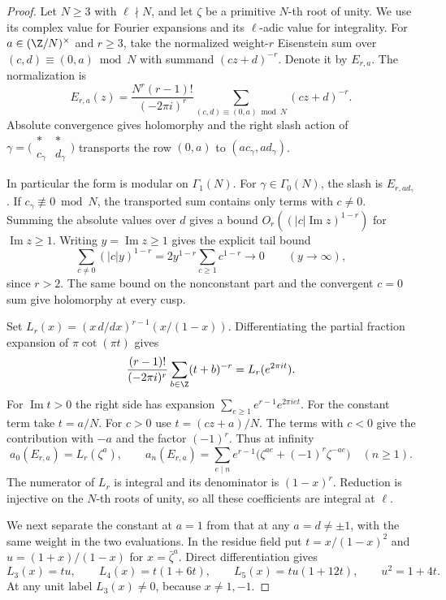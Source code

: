 \begin{proof}
Let \(N\geq3\) with \(\ell\nmid N\), and let
\(\zeta\) be a primitive \(N\)-th root of unity. We use its complex
value for Fourier expansions and its \(\ell\)-adic value for
integrality. For \(a\in(\Z/N)^\times\) and \(r\geq3\), take the
normalized weight-\(r\) Eisenstein sum over \((c,d)\equiv(0,a)\bmod N\)
with summand \((cz+d)^{-r}\). Denote it by \(E_{r,a}\). The normalization is
\[
 E_{r,a}(z)=\frac{N^r(r-1)!}{(-2\pi i)^r}
          \sum_{(c,d)\equiv(0,a)\bmod N}(cz+d)^{-r}.
\]
Absolute convergence gives holomorphy and the right slash action of
\(\gamma=\bigl(\begin{smallmatrix}*&*\\c_\gamma&d_\gamma\end{smallmatrix}\bigr)\)
transports the row \((0,a)\) to \((ac_\gamma,ad_\gamma)\).

In particular the form is modular on \(\Gamma_1(N)\). For
\(\gamma\in\Gamma_0(N)\), the slash is \(E_{r,ad_\gamma}\).
If \(c_\gamma\not\equiv0\bmod N\), the transported sum contains
only terms with \(c\ne0\). Summing the absolute values over \(d\)
gives a bound \(O_r((|c|\operatorname{Im} z)^{1-r})\) for
\(\operatorname{Im} z\geq1\). Writing \(y=\operatorname{Im}z\ge1\) gives the explicit tail bound
\[
 \sum_{c\ne0}(|c|y)^{1-r}
 =2y^{1-r}\sum_{c\ge1}c^{1-r}\longrightarrow0
 \qquad(y\to\infty),
\]
since \(r>2\). The same bound on the
nonconstant part and the convergent \(c=0\) sum give holomorphy
at every cusp.

Set \(L_r(x)=(x\,d/dx)^{r-1}(x/(1-x))\). Differentiating the
partial fraction expansion of \(\pi\cot(\pi t)\) gives
\[
  \frac{(r-1)!}{(-2\pi i)^r}
      \sum_{b\in\Z}(t+b)^{-r}
     =L_r(e^{2\pi i t}).
\]
For \(\operatorname{Im}t>0\) the right side has expansion
\(\sum_{e\geq1}e^{r-1}e^{2\pi i et}\). For the constant
term take \(t=a/N\). For \(c>0\) use \(t=(cz+a)/N\).
The terms with \(c<0\) give the contribution with \(-a\)
and the factor \((-1)^r\). Thus at infinity
\[
 a_0(E_{r,a})=L_r(\zeta^a),\qquad
 a_n(E_{r,a})=\sum_{e\mid n}e^{r-1}
              \bigl(\zeta^{ae}+(-1)^r\zeta^{-ae}\bigr)
       \quad(n\geq1).
\]
The numerator of \(L_r\) is integral and its denominator is
\((1-x)^r\). Reduction is injective on the \(N\)-th roots of
unity, so all these coefficients are integral at \(\ell\).

We next separate the constant at \(a=1\) from that at any
\(a=d\ne\pm1\), with the same weight in the two evaluations.
In the residue field put \(t=x/(1-x)^2\) and
\(u=(1+x)/(1-x)\) for \(x=\bar\zeta^a\). Direct differentiation gives
\[
 L_3(x)=tu,\qquad L_4(x)=t(1+6t),\qquad
 L_5(x)=tu(1+12t),\qquad u^2=1+4t.
\]
At any unit label \(L_3(x)\ne0\), because \(x\ne1,-1\).


\end{proof}
